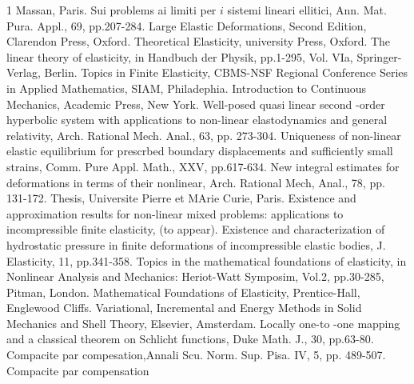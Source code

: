 \begin{thebibliography}{99}
  1 Massan, Paris.  
 Sui problems ai limiti per $i$
  sistemi lineari ellitici, Ann. Mat. Pura. Appl., 69, pp.207-284. 
 Large Elastic
  Deformations, Second Edition, Clarendon Press, Oxford. 
 Theoretical Elasticity,
  university Press, Oxford. 
 The linear theory of elasticity, in
  Handbuch der Physik, pp.1-295, Vol. VIa, Springer-Verlag,
  Berlin. 
 Topics in Finite Elasticity,
  CBMS-NSF Regional Conference Series in Applied Mathematics, SIAM,
  Philadephia. 
 Introduction to Continuous
  Mechanics, Academic Press, New York. 
  Well-posed quasi linear second -order hyperbolic system with
  applications to non-linear elastodynamics and general relativity,
  Arch. Rational Mech. Anal., 63, pp. 273-304. 
 Uniqueness of non-linear elastic
  equilibrium for prescrbed boundary displacements and sufficiently
  small strains, Comm. Pure Appl. Math., XXV, pp.617-634. 
 New integral estimates for
  deformations in terms of their nonlinear, Arch. Rational Mech,
  Anal., 78, pp. 131-172. 
 Thesis, Universite Pierre et MArie
  Curie, Paris. 
 Existence and approximation results
  for non-linear mixed problems: applications to incompressible finite
  elasticity, (to appear). 
 Existence and
  characterization of hydrostatic pressure in finite deformations of
  incompressible elastic bodies, J. Elasticity, 11, pp.341-358. 
 Topics in the
  mathematical foundations of elasticity, in Nonlinear Analysis and
  Mechanics: Heriot-Watt Symposim, Vol.2, pp.30-285, Pitman,
  London.  
 Mathematical
  Foundations of Elasticity, Prentice-Hall, Englewood Cliffs. 
 Variational, Incremental and Energy
  Methods in Solid Mechanics and Shell Theory, Elsevier, Amsterdam.  
 Locally one-to -one
  mapping and a classical theorem on Schlicht functions, Duke
  Math. J., 30, pp.63-80. 
 Compacite par compesation,Annali
  Scu. Norm. Sup. Pisa. IV, 5, pp. 489-507. 
 Compacite par compensation

\end{thebibliography}
